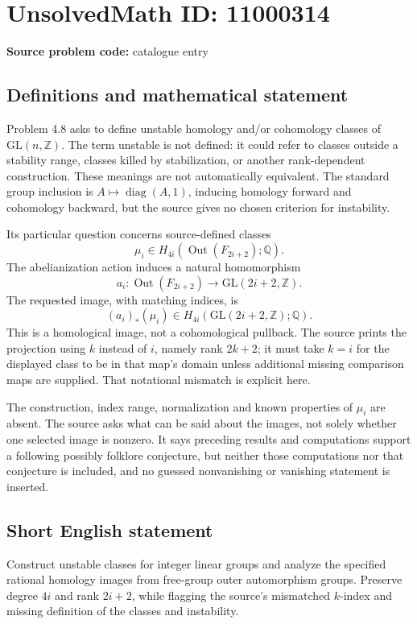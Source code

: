\documentclass[11pt]{article}
\newcommand{\Z}{\mathbb{Z}}
\newcommand{\Q}{\mathbb{Q}}
\begin{document}
\section*{UnsolvedMath ID: 11000314}
\textbf{Source problem code:} catalogue entry
\subsection{Definitions and mathematical statement}
Problem 4.8 asks to define unstable homology and/or cohomology classes of \(\mathrm{GL}(n,\Z)\). The term unstable is not defined: it could refer to classes outside a stability range, classes killed by stabilization, or another rank-dependent construction. These meanings are not automatically equivalent. The standard group inclusion is \(A\mapsto\operatorname{diag}(A,1)\), inducing homology forward and cohomology backward, but the source gives no chosen criterion for instability.

Its particular question concerns source-defined classes
\[
 \mu_i\in H_{4i}(\operatorname{Out}(F_{2i+2});\Q).
\]
The abelianization action induces a natural homomorphism
\[
 a_i:\operatorname{Out}(F_{2i+2})
       \longrightarrow\mathrm{GL}(2i+2,\Z).
\]
The requested image, with matching indices, is
\[
 (a_i)_*(\mu_i)\in H_{4i}(\mathrm{GL}(2i+2,\Z);\Q).
\]
This is a homological image, not a cohomological pullback. The source prints the projection using \(k\) instead of \(i\), namely rank \(2k+2\); it must take \(k=i\) for the displayed class to be in that map's domain unless additional missing comparison maps are supplied. That notational mismatch is explicit here.

The construction, index range, normalization and known properties of \(\mu_i\) are absent. The source asks what can be said about the images, not solely whether one selected image is nonzero. It says preceding results and computations support a following possibly folklore conjecture, but neither those computations nor that conjecture is included, and no guessed nonvanishing or vanishing statement is inserted.
\subsection{Short English statement}
Construct unstable classes for integer linear groups and analyze the specified rational homology images from free-group outer automorphism groups. Preserve degree \(4i\) and rank \(2i+2\), while flagging the source's mismatched \(k\)-index and missing definition of the classes and instability.
\end{document}

